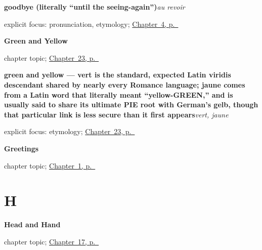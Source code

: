 \noindent\begin{minipage}[t]{\linewidth}
\raggedright
\textbf{goodbye (literally \textquotedblleft{}until the seeing-again\textquotedblright{})}\enspace\emph{au revoir}\par
\footnotesize explicit focus: pronunciation, etymology; \hyperref[ch:farewells]{Chapter~4, p.~\pageref*{ch:farewells}}
\end{minipage}\par\smallskip

\noindent\begin{minipage}[t]{\linewidth}
\raggedright
\textbf{Green and Yellow}\par
\footnotesize chapter topic; \hyperref[ch:fr-green-and-yellow]{Chapter~23, p.~\pageref*{ch:fr-green-and-yellow}}
\end{minipage}\par\smallskip

\noindent\begin{minipage}[t]{\linewidth}
\raggedright
\textbf{green and yellow — vert is the standard, expected Latin viridis descendant shared by nearly every Romance language; jaune comes from a Latin word that literally meant \textquotedblleft{}yellow-GREEN,\textquotedblright{} and is usually said to share its ultimate PIE root with German's gelb, though that particular link is less secure than it first appears}\enspace\emph{vert, jaune}\par
\footnotesize explicit focus: etymology; \hyperref[ch:fr-green-and-yellow]{Chapter~23, p.~\pageref*{ch:fr-green-and-yellow}}
\end{minipage}\par\smallskip

\noindent\begin{minipage}[t]{\linewidth}
\raggedright
\textbf{Greetings}\par
\footnotesize chapter topic; \hyperref[ch:greetings]{Chapter~1, p.~\pageref*{ch:greetings}}
\end{minipage}\par\smallskip

\section*{H}

\noindent\begin{minipage}[t]{\linewidth}
\raggedright
\textbf{Head and Hand}\par
\footnotesize chapter topic; \hyperref[ch:fr-head-and-hand]{Chapter~17, p.~\pageref*{ch:fr-head-and-hand}}
\end{minipage}\par\smallskip

